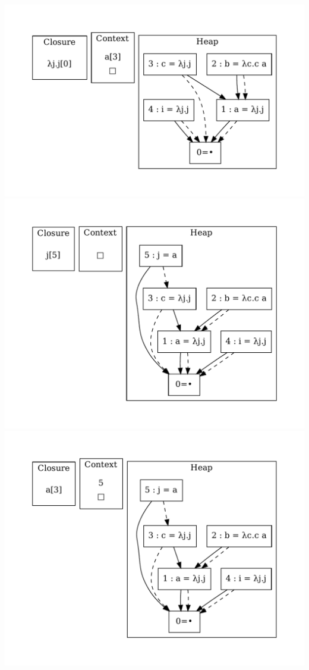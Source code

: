 \includegraphics[width=0.99\linewidth/2]{figures/18.pdf}
\includegraphics[width=0.99\linewidth/2]{figures/19.pdf}
\includegraphics[width=0.99\linewidth/2]{figures/20.pdf}
